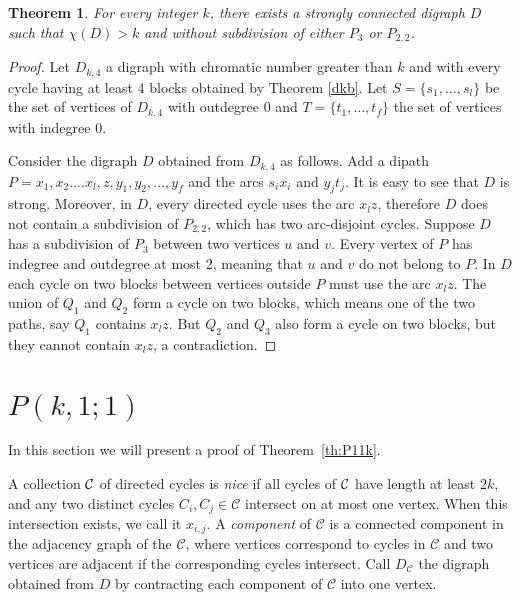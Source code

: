 \documentclass[utf8,10pt]{article}
\theoremstyle{plain}
\newtheorem{theorem}{Theorem}
\theoremstyle{definition}
\theoremstyle{remark}
\begin{document}
\begin{theorem}
For every integer $k$, there exists a strongly connected digraph $D$ such that $\chi(D) >k$ and without subdivision of either $P_3$ or $P_{2,2}$. 
\end{theorem}

\begin{proof}
Let $D_{k,4}$ a digraph with chromatic number greater than $k$ and with every cycle having at least 4 blocks obtained by Theorem \ref{dkb}.
Let $S = \{s_1, \dots,  s_l\}$ be the set of vertices of $D_{k,4}$ with outdegree 0 and $T = \{t_1, \dots, t_f\}$ the set of vertices with indegree 0.

Consider the digraph $D$ obtained from $D_{k,4}$ as follows. Add a dipath  $P = x_1,x_2....x_l,z,y_1,y_2,\dots, y_f$ and the arcs $s_ix_i$ and
$y_jt_j$. It is easy to see that $D$ is strong.
Moreover, in $D$, every directed cycle uses the arc $x_lz$, therefore $D$ does not contain a subdivision of $P_{2,2}$, which has two arc-disjoint cycles. 
Suppose $D$ has a subdivision of $P_3$ between two vertices $u$ and $v$. Every vertex of $P$ has indegree and outdegree at most 2, meaning that $u$ and $v$ do not
belong to $P$. In $D$ each cycle on two blocks between vertices outside $P$ must use the arc $x_lz$. The union of $Q_1$ and $Q_2$ form a cycle on two blocks, 
which means one of the two paths, say $Q_1$ contains $x_lz$. But $Q_2$ and $Q_3$ also form a cycle on two blocks, but they cannot contain $x_lz$, a contradiction.
\end{proof}




\section{$P(k,1;1)$}

In this section we will present a proof of Theorem~\ref{th:P11k}.

A collection ${\cal C}$ of directed cycles is {\it nice} if all cycles of ${\cal C}$ have length at least $2k$, and
any two distinct cycles $C_i,C_j\in\mathcal C$ intersect on at most one vertex. When this intersection exists, we call it $x_{i,j}$.
A {\it component} of $\mathcal{C}$ is a connected component in the adjacency graph of the $\mathcal{C}$, where vertices correspond to cycles in $\mathcal{C}$
and two vertices are adjacent if the corresponding cycles intersect. 
Call $D_{\mathcal{C}}$ the digraph obtained from $D$ by contracting each component of $\mathcal{C}$ into one vertex. 
\end{document}
